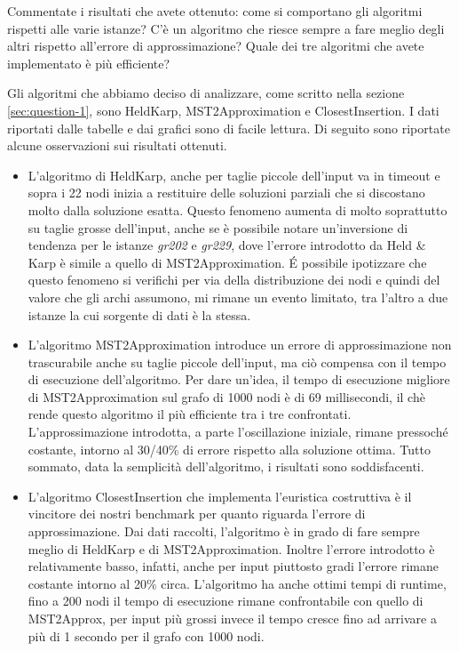 \begin{displayquote}
Commentate i risultati che avete ottenuto: come si comportano gli
algoritmi rispetti alle varie istanze? C'è un algoritmo che riesce
sempre a fare meglio degli altri rispetto all'errore di
approssimazione? Quale dei tre algoritmi che avete implementato è
più efficiente?
\end{displayquote}


\noindent Gli algoritmi che abbiamo deciso di analizzare, come scritto
nella sezione \ref{sec:question-1}, sono HeldKarp, MST2Approximation e
ClosestInsertion. I dati riportati dalle tabelle e dai grafici sono di
facile lettura. Di seguito sono riportate alcune osservazioni sui
risultati ottenuti.

\begin{itemize}
    \item L'algoritmo di HeldKarp, anche per taglie piccole dell'input
      va in timeout e sopra i 22 nodi inizia a restituire delle
      soluzioni parziali che si discostano molto dalla soluzione
      esatta. Questo fenomeno aumenta di molto soprattutto su taglie
      grosse dell'input, anche se è possibile notare un'inversione di
      tendenza per le istanze \emph{gr202} e \emph{gr229}, dove
      l'errore introdotto da Held \& Karp è simile a quello di
      MST2Approximation. \'E possibile ipotizzare che questo fenomeno
      si verifichi per via della distribuzione dei nodi e quindi del
      valore che gli archi assumono, mi rimane un evento limitato, tra
      l'altro a due istanze la cui sorgente di dati è la stessa. \\

    \item L'algoritmo MST2Approximation introduce un errore di
      approssimazione non trascurabile anche su taglie piccole
      dell'input, ma ciò compensa con il tempo di esecuzione
      dell'algoritmo. Per dare un'idea, il tempo di esecuzione
      migliore di MST2Approximation sul grafo di 1000 nodi è di 69
      millisecondi, il chè rende questo algoritmo il più efficiente
      tra i tre confrontati. L'approssimazione introdotta, a parte
      l'oscillazione iniziale, rimane pressoché costante, intorno al
      30/40\% di errore rispetto alla soluzione ottima. Tutto sommato,
      data la semplicità dell'algoritmo, i risultati sono soddisfacenti. \\

    \item L'algoritmo ClosestInsertion che implementa l'euristica
      costruttiva è il vincitore dei nostri benchmark per quanto
      riguarda l'errore di approssimazione. Dai dati raccolti,
      l'algoritmo è in grado di fare sempre meglio di HeldKarp e di
      MST2Approximation. Inoltre l'errore introdotto è relativamente
      basso, infatti, anche per input piuttosto gradi l'errore rimane
      costante intorno al 20\% circa. L'algoritmo ha anche ottimi
      tempi di runtime, fino a 200 nodi il tempo di esecuzione rimane
      confrontabile con quello di MST2Approx, per input più grossi
      invece il tempo cresce fino ad arrivare a più di 1 secondo per
      il grafo con 1000 nodi. \\


\end{itemize}
